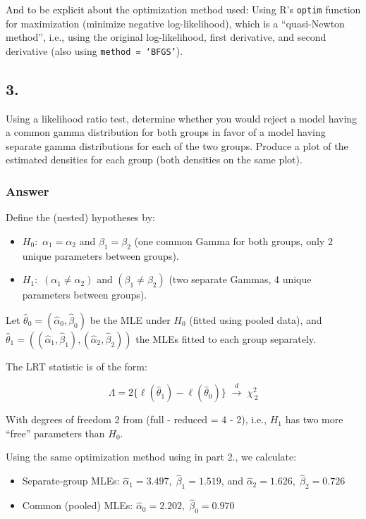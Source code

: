 \documentclass[
]{article}
\providecommand{\tightlist}{%
  \setlength{\itemsep}{0pt}\setlength{\parskip}{0pt}}
\begin{document}
And to be explicit about the optimization method used: Using R's
\texttt{optim} function for maximization (minimize negative
log-likelihood), which is a ``quasi-Newton method'', i.e., using the
original log-likelihood, first derivative, and second derivative (also
using \texttt{method\ =\ ‘BFGS’}).

\newpage

\subsection{3.}\label{section-2}

Using a likelihood ratio test, determine whether you would reject a
model having a common gamma distribution for both groups in favor of a
model having separate gamma distributions for each of the two groups.
Produce a plot of the estimated densities for each group (both densities
on the same plot).

\subsubsection{Answer}\label{answer-2}

Define the (nested) hypotheses by:

\begin{itemize}
\tightlist
\item
  \(H_0:\) \(\alpha_1=\alpha_2\) and \(\beta_1=\beta_2\) (one common
  Gamma for both groups, only 2 unique parameters between groups).
\item
  \(H_1:\) \((\alpha_1 \neq \alpha_2)\) and \((\beta_1 \neq \beta_2)\)
  (two separate Gammas, 4 unique parameters between groups).
\end{itemize}

Let \(\hat\theta_0=(\hat\alpha_0,\hat\beta_0)\) be the MLE under \(H_0\)
(fitted using pooled data), and
\(\hat\theta_1=((\hat\alpha_1,\hat\beta_1),(\hat\alpha_2,\hat\beta_2))\)
the MLEs fitted to each group separately.

The LRT statistic is of the form:

\[
\Lambda = 2\bigl\{\ell(\hat\theta_1)-\ell(\hat\theta_0)\bigr\}
\;\xrightarrow{d}\; \chi^2_{\,2}
\]

With degrees of freedom 2 from (full - reduced = 4 - 2), i.e., \(H_1\)
has two more ``free'' parameters than \(H_0\).

Using the same optimization method using in part 2., we calculate:

\begin{itemize}
\item
  Separate-group MLEs: \(\hat\alpha_1=3.497,\;\hat\beta_1=1.519\), and
  \(\hat\alpha_2=1.626,\;\hat\beta_2=0.726\)
\item
  Common (pooled) MLEs: \(\hat\alpha_0=2.202,\;\hat\beta_0=0.970\)
\end{itemize}
\end{document}
